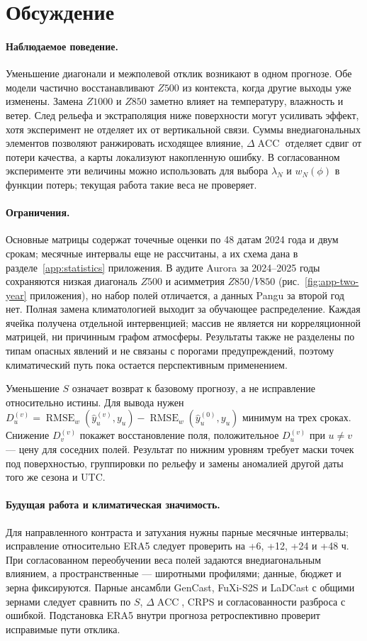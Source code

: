 \documentclass{article}
\newcommand{\rmse}{\operatorname{RMSE}}
\newcommand{\acc}{\operatorname{ACC}}
\begin{document}
\section{Обсуждение}

\paragraph{Наблюдаемое поведение.} Уменьшение диагонали и межполевой отклик возникают в одном прогнозе. Обе модели частично восстанавливают $Z500$ из контекста, когда другие выходы уже изменены. Замена $Z1000$ и $Z850$ заметно влияет на температуру, влажность и ветер. След рельефа и экстраполяция ниже поверхности могут усиливать эффект, хотя эксперимент не отделяет их от вертикальной связи. Суммы внедиагональных элементов позволяют ранжировать исходящее влияние, $\Delta\acc$ отделяет сдвиг от потери качества, а карты локализуют накопленную ошибку. В согласованном эксперименте эти величины можно использовать для выбора $\lambda_N$ и $w_N(\phi)$ в функции потерь; текущая работа такие веса не проверяет.

\paragraph{Ограничения.} Основные матрицы содержат точечные оценки по 48 датам 2024 года и двум срокам; месячные интервалы еще не рассчитаны, а их схема дана в разделе~\ref{app:statistics} приложения. В аудите Aurora за 2024--2025 годы сохраняются низкая диагональ $Z500$ и асимметрия $Z850$/$V850$ (рис.~\ref{fig:app-two-year} приложения), но набор полей отличается, а данных Pangu за второй год нет. Полная замена климатологией выходит за обучающее распределение. Каждая ячейка получена отдельной интервенцией; массив не является ни корреляционной матрицей, ни причинным графом атмосферы. Результаты также не разделены по типам опасных явлений и не связаны с порогами предупреждений, поэтому климатический путь пока остается перспективным применением.

Уменьшение $S$ означает возврат к базовому прогнозу, а не исправление относительно истины. Для вывода нужен $D_u^{(v)}=\rmse_w(\hat y_u^{(v)},y_u)-\rmse_w(\hat y_u^{(0)},y_u)$ минимум на трех сроках. Снижение $D_v^{(v)}$ покажет восстановление поля, положительное $D_u^{(v)}$ при $u\ne v$ --- цену для соседних полей. Результат по нижним уровням требует маски точек под поверхностью, группировки по рельефу и замены аномалией другой даты того же сезона и UTC.

\paragraph{Будущая работа и климатическая значимость.} Для направленного контраста и затухания нужны парные месячные интервалы; исправление относительно ERA5 следует проверить на +6, +12, +24 и +48 ч. При согласованном переобучении веса полей задаются внедиагональным влиянием, а пространственные --- широтными профилями; данные, бюджет и зерна фиксируются. Парные ансамбли GenCast, FuXi-S2S и LaDCast с общими зернами следует сравнить по $S$, $\Delta\acc$, CRPS и согласованности разброса с ошибкой. Подстановка ERA5 внутри прогноза ретроспективно проверит исправимые пути отклика.
\end{document}

